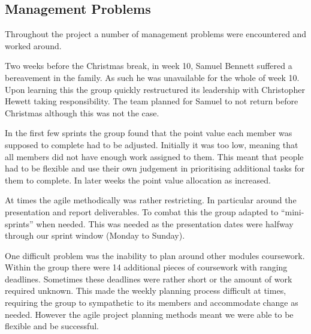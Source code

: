 \subsection{Management Problems}

Throughout the project a number of management problems were encountered and worked around.

Two weeks before the Christmas break, in week 10, Samuel Bennett suffered a bereavement in the family. As such he was unavailable for the whole of week 10. Upon learning this the group quickly restructured its leadership with Christopher Hewett taking responsibility. The team planned for Samuel to not return before Christmas although this was not the case.

In the first few sprints the group found that the point value each member was supposed to complete had to be adjusted. Initially it was too low, meaning that all members did not have enough work assigned to them. This meant that people had to be flexible and use their own judgement in prioritising additional tasks for them to complete. In later weeks the point value allocation as increased.

At times the agile methodically was rather restricting. In particular around the presentation and report deliverables. To combat this the group adapted to ``mini-sprints'' when needed. This was needed as the presentation dates were halfway through our sprint window (Monday to Sunday).

One difficult problem was the inability to plan around other modules coursework. Within the group there were 14 additional pieces of coursework with ranging deadlines. Sometimes these deadlines were rather short or the amount of work required unknown. This made the weekly planning process difficult at times, requiring the group to sympathetic to its members and accommodate change as needed. However the agile project planning methods meant we were able to be flexible and be successful.